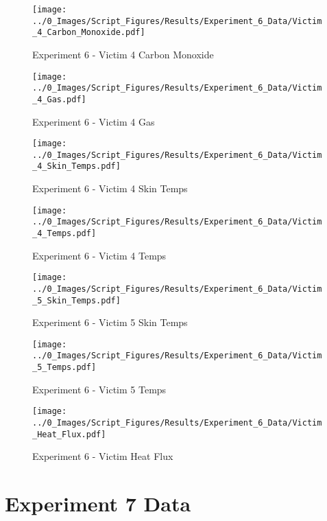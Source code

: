 	\begin{figure}[H]
		\centering
		\texttt{[image: ../0\_Images/Script\_Figures/Results/Experiment\_6\_Data/Victim\_4\_Carbon\_Monoxide.pdf]}
		\caption[]{Experiment 6 - Victim 4 Carbon Monoxide}
	\end{figure}
 
	\clearpage

	\begin{figure}[H]
		\centering
		\texttt{[image: ../0\_Images/Script\_Figures/Results/Experiment\_6\_Data/Victim\_4\_Gas.pdf]}
		\caption[]{Experiment 6 - Victim 4 Gas}
	\end{figure}
 

	\begin{figure}[H]
		\centering
		\texttt{[image: ../0\_Images/Script\_Figures/Results/Experiment\_6\_Data/Victim\_4\_Skin\_Temps.pdf]}
		\caption[]{Experiment 6 - Victim 4 Skin Temps}
	\end{figure}
 
	\clearpage

	\begin{figure}[H]
		\centering
		\texttt{[image: ../0\_Images/Script\_Figures/Results/Experiment\_6\_Data/Victim\_4\_Temps.pdf]}
		\caption[]{Experiment 6 - Victim 4 Temps}
	\end{figure}
 

	\begin{figure}[H]
		\centering
		\texttt{[image: ../0\_Images/Script\_Figures/Results/Experiment\_6\_Data/Victim\_5\_Skin\_Temps.pdf]}
		\caption[]{Experiment 6 - Victim 5 Skin Temps}
	\end{figure}
 
	\clearpage

	\begin{figure}[H]
		\centering
		\texttt{[image: ../0\_Images/Script\_Figures/Results/Experiment\_6\_Data/Victim\_5\_Temps.pdf]}
		\caption[]{Experiment 6 - Victim 5 Temps}
	\end{figure}
 

	\begin{figure}[H]
		\centering
		\texttt{[image: ../0\_Images/Script\_Figures/Results/Experiment\_6\_Data/Victim\_Heat\_Flux.pdf]}
		\caption[]{Experiment 6 - Victim Heat Flux}
	\end{figure}
 
	\clearpage

\clearpage		\large
\section{Experiment 7 Data} \label{App:Exp7Results} 

